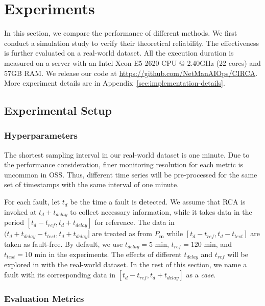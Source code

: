 \section{Experiments}\label{sec:experiments}

In this section, we compare the performance of different methods.
We first conduct a simulation study to verify their theoretical reliability.
The effectiveness is further evaluated on a real-world dataset.
All the execution duration is measured on a server with an Intel Xeon E5-2620 CPU @ 2.40GHz (22 cores) and 57GB RAM.
We release our code at \url{https://github.com/NetManAIOps/CIRCA}.
More experiment details are in Appendix~\ref{sec:implementation-details}. 

\subsection{Experimental Setup}

\subsubsection{Hyperparameters}

The shortest sampling interval in our real-world dataset is one minute.
Due to the performance consideration, finer monitoring resolution for each metric is uncommon in OSS.
Thus, different time series will be pre-processed for the same set of timestamps with the same interval of one minute.

For each fault, let $t_{d}$ be the \textbf{t}ime a fault is \textbf{d}etected.
We assume that RCA is invoked at $t_{d} + t_{delay}$ to collect necessary information, while it takes data in the period $[t_{d} - t_{ref}, t_{d} + t_{delay}]$ for reference.
The data in $(t_{d} + t_{delay} - t_{test}, t_{d} + t_{delay}]$ are treated as from $P_{\mathbf{m}}$ while $[t_{d} - t_{ref}, t_{d} - t_{test}]$ are taken as fault-free.
By default, we use $t_{delay} = 5$ min, $t_{ref} = 120$ min, and $t_{test} = 10$ min in the experiments.
The effects of different $t_{delay}$ and $t_{ref}$ will be explored in  with the real-world dataset.
In the rest of this section, we name a fault with its corresponding data in $[t_{d} - t_{ref}, t_{d} + t_{delay}]$ as a \textit{case}.

\subsubsection{Evaluation Metrics}

